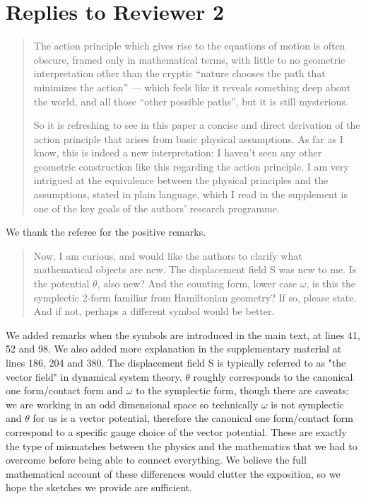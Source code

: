 \documentclass[11pt, executivepaper]{article}
\begin{document}
\section{Replies to Reviewer 2}

\begin{quote}
The action principle which gives rise to the equations of motion is often obscure, framed only in mathematical terms, with little to no geometric interpretation other than the cryptic “nature chooses the path that minimizes the action” — which feels like it reveals something deep about the world, and all those “other possible paths”, but it is still mysterious. 

So it is refreshing to see in this paper a concise and direct derivation of the action principle that arises from basic physical assumptions. As far as I know, this is indeed a new interpretation: I haven’t seen any other geometric construction like this regarding the action principle. I am very intrigued at the equivalence between the physical principles and the assumptions, stated in plain language, which I read in the supplement is one of the key goals of the authors’ research programme. 
\end{quote}

We thank the referee for the positive remarks.

\begin{quote}
	Now, I am curious, and would like the authors to clarify what mathematical objects are new.  The displacement field S was new to me. Is the potential $\theta$, also new?  And the counting form, lower case $\omega$, is this the symplectic 2-form familiar from Hamiltonian geometry?  If so, please state. And if not, perhaps a different symbol would be better.
\end{quote}
We added remarks when the symbols are introduced in the main text, at lines 41, 52 and 98. We also added more explanation in the supplementary material at lines 186, 204 and 380. The displacement field S is typically referred to as "the vector field" in dynamical system theory. $\theta$ roughly corresponds to the canonical one form/contact form and $\omega$ to the symplectic form, though there are caveats: we are working in an odd dimensional space so technically $\omega$ is not symplectic and $\theta$ for us is a vector potential, therefore the canonical one form/contact form correspond to a specific gauge choice of the vector potential. These are exactly the type of mismatches between the physics and the mathematics that we had to overcome before being able to connect everything. We believe the full mathematical account of these differences would clutter the exposition, so we hope the sketches we provide are sufficient.
\end{document}
